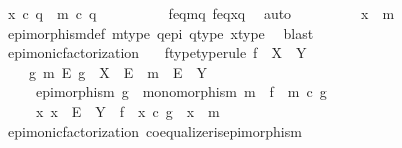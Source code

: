 \begin{isabellebody}
\ {\isachardoublequoteopen}x\ {\isasymcirc}\isactrlsub c\ q\ {\isacharequal}{\kern0pt}\ m\ {\isasymcirc}\isactrlsub c\ q{\isachardoublequoteclose}\isanewline
\ \ \ \ \ \ \ \ \isamarkupfalse%
\ f{\isacharunderscore}{\kern0pt}eq{\isacharunderscore}{\kern0pt}m{\isacharunderscore}{\kern0pt}q\ f{\isacharunderscore}{\kern0pt}eq{\isacharunderscore}{\kern0pt}x{\isacharunderscore}{\kern0pt}q\ \isamarkupfalse%
\ auto\isanewline
\ \ \ \ \ \ \isamarkupfalse%
\ \isamarkupfalse%
\ {\isachardoublequoteopen}x\ {\isacharequal}{\kern0pt}\ m{\isachardoublequoteclose}\isanewline
\ \ \ \ \ \ \ \ \isamarkupfalse%
\ epimorphism{\isacharunderscore}{\kern0pt}def{}\ m{\isacharunderscore}{\kern0pt}type\ q{\isacharunderscore}{\kern0pt}epi\ q{\isacharunderscore}{\kern0pt}type\ x{\isacharunderscore}{\kern0pt}type\ \isamarkupfalse%
\ blast\isanewline
\ \ \ \ \isamarkupfalse%
\isanewline
\ \ \isamarkupfalse%
\isanewline
{}\isamarkupfalse%
%
\endisatagproof
{\isafoldproof}%
%
\isadelimproof
\isanewline
%
\endisadelimproof
\isanewline
{}\isamarkupfalse%
\ epi{\isacharunderscore}{\kern0pt}monic{\isacharunderscore}{\kern0pt}factorization{}{\isacharcolon}{\kern0pt}\isanewline
\ \ \ f{\isacharunderscore}{\kern0pt}type{\isacharbrackleft}{\kern0pt}type{\isacharunderscore}{\kern0pt}rule{\isacharbrackright}{\kern0pt}{\isacharcolon}{\kern0pt}\ {\isachardoublequoteopen}f\ {\isacharcolon}{\kern0pt}\ X\ {\isasymrightarrow}\ Y{\isachardoublequoteclose}\isanewline
\ \ \ {\isachardoublequoteopen}{\isasymexists}\ g\ m\ E{\isachardot}{\kern0pt}\ g\ {\isacharcolon}{\kern0pt}\ X\ {\isasymrightarrow}\ E\ {\isasymand}\ m\ {\isacharcolon}{\kern0pt}\ E\ {\isasymrightarrow}\ Y\ \isanewline
\ \ \ \ {\isasymand}\ epimorphism\ g\ {\isasymand}\ monomorphism\ m\ {\isasymand}\ f\ {\isacharequal}{\kern0pt}\ m\ {\isasymcirc}\isactrlsub c\ g\isanewline
\ \ \ \ {\isasymand}\ {\isacharparenleft}{\kern0pt}{\isasymforall}x{\isachardot}{\kern0pt}\ x\ {\isacharcolon}{\kern0pt}\ E\ {\isasymrightarrow}\ Y\ {\isasymlongrightarrow}\ f\ {\isacharequal}{\kern0pt}\ x\ {\isasymcirc}\isactrlsub c\ g\ {\isasymlongrightarrow}\ x\ {\isacharequal}{\kern0pt}\ m{\isacharparenright}{\kern0pt}{\isachardoublequoteclose}\isanewline
%
\isadelimproof
\ \ %
\endisadelimproof
%
\isatagproof
{}\isamarkupfalse%
\ epi{\isacharunderscore}{\kern0pt}monic{\isacharunderscore}{\kern0pt}factorization\ coequalizer{\isacharunderscore}{\kern0pt}is{\isacharunderscore}{\kern0pt}epimorphism\ \isamarkupfalse%

\end{isabellebody}
